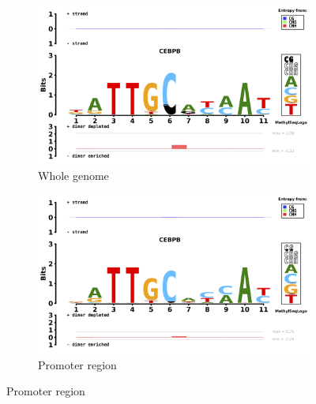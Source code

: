 \documentclass{PHlab-thesis}
\begin{document}
\begin{figure}[H]
	\centering
	\begin{subfigure}[b]{0.9\textwidth}
		\includegraphics[width=\textwidth]{figures/CEBPBPwg.png}
		\caption{Whole genome}
		\label{fig:CEBPBWhole-genome} 
	\end{subfigure}
	\begin{subfigure}[b]{0.9\textwidth}
		\includegraphics[width=\textwidth]{figures/CEBPBPROMOTOR.png}
		\caption{Promoter region}
		\label{fig:CEBPBpromotor} 
	\end{subfigure}
\end{figure}
	
\end{document}
